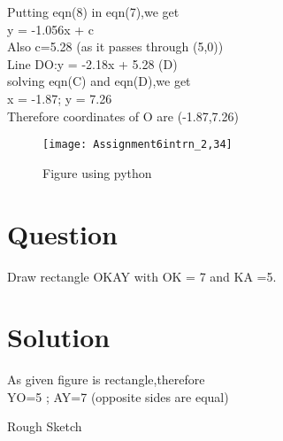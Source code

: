 \documentclass[a4paper,12pt]{article}
\begin{document}
Putting eqn(8) in eqn(7),we get\\

y = -1.056x + c\\

Also c=5.28       \hspace{3cm} (as it passes through (5,0))\\

Line DO:y = -2.18x + 5.28 \hspace*{2cm}(D)\\

solving  eqn(C) and eqn(D),we get\\

\hspace*{1cm}   x = -1.87;  y = 7.26\\

Therefore coordinates of O are (-1.87,7.26)\\

















\begin{figure}[h]
\centering
\texttt{[image: Assignment6intrn\_2,34]}
\caption{Figure using python}
\end{figure} 

\pagebreak


\section*{{\small Question}}
Draw rectangle OKAY with OK = 7 and KA =5.


\section*{{\small Solution}}

As given figure is rectangle,therefore\\

YO=5 ; AY=7       (opposite sides are equal)

\begin{center}

\end{center}
\hspace*{6cm} Rough Sketch\\
\end{document}
